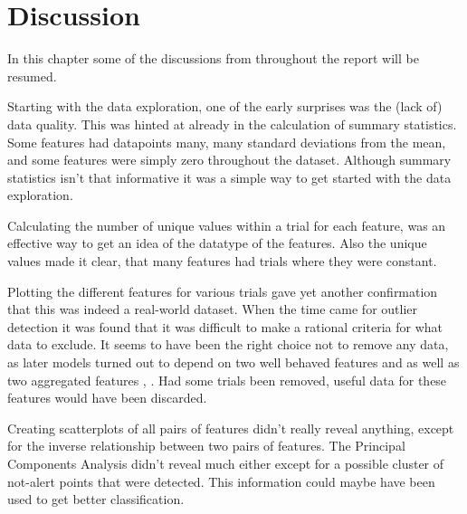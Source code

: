 \chapter{Discussion}

In this chapter some of the discussions from throughout the report will be resumed. \par

Starting with the data exploration, one of the early surprises was the (lack of) data quality. This was hinted at already in the calculation of summary statistics. Some features had datapoints many, many standard deviations from the mean, and some features were simply zero throughout the dataset. Although summary statistics isn't that informative it was a simple way to get started with the data exploration. \par

Calculating the number of unique values within a trial for each feature, was an effective way to get an idea of the datatype of the features. Also the unique values made it clear, that many features had trials where they were constant. \par

Plotting the different features for various trials gave yet another confirmation that this was indeed a real-world dataset. When the time came for outlier detection it was found that it was difficult to make a rational criteria for what data to exclude. It seems to have been the right choice not to remove any data, as later models turned out to depend on two well behaved features  and  as well as two aggregated features , . Had some trials been removed, useful data for these features would have been discarded. \par

Creating scatterplots of all pairs of features didn't really reveal anything, except for the inverse relationship between two pairs of features. The Principal Components Analysis didn't reveal much either except for a possible cluster of not-alert points that were detected. This information could maybe have been used to get better classification. \par

